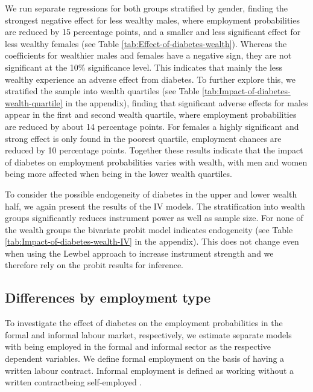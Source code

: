 We run separate regressions for both groups stratified by gender,
finding the strongest negative effect for less wealthy males, where
employment probabilities are reduced by 15 percentage points, and a smaller
and less significant effect for less wealthy females (see Table \ref{tab:Effect-of-diabetes-wealth}).
Whereas the coefficients for wealthier males and females have a negative
sign, they are not significant at the 10\% significance level.
This indicates that mainly the less wealthy experience an adverse
effect from diabetes. To further explore this, we stratified the sample
into wealth quartiles (see Table \ref{tab:Impact-of-diabetes-wealth-quartile} in the appendix), finding that significant adverse effects for males
appear in the first and second wealth quartile, where employment probabilities
are reduced by about 14 percentage points. For females a highly significant
and strong effect is only found in the poorest quartile, \DIFdelbegin {}\DIFdelend \DIFaddbegin {}\DIFaddend employment
chances are reduced by 10 percentage points. Together these results
indicate that the impact of diabetes on employment probabilities varies
with wealth, with men and women being more affected when being in
the lower wealth quartiles.


To consider the possible endogeneity of diabetes in the upper and
lower wealth half, we again present the results of the \ac{IV} models.
The stratification into wealth groups significantly reduces instrument
power as well as sample size. For none of the wealth groups the bivariate
probit model indicates endogeneity (see Table \ref{tab:Impact-of-diabetes-wealth-IV} in the appendix). This does not change even when
using the Lewbel approach to increase instrument strength and we therefore
rely on the probit results for inference. 


\subsection{Differences by employment type}



To investigate the effect of diabetes on the employment probabilities in
the formal and informal labour market, respectively, we estimate separate
models with being employed in the formal and informal sector as the
respective dependent variables. We define formal employment on the
basis of having a written labour contract. Informal employment is
defined as working without a written contract\DIFdelbegin {}\DIFdelend \DIFaddbegin \DIFadd{, }\DIFaddend being self-employed \DIFaddbegin {}\DIFaddend . 



